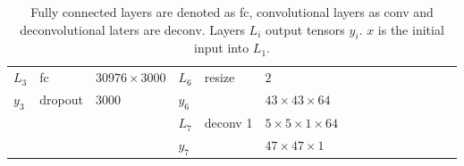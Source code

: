 \begin{landscape}
\begin{table}[h]
{\begin{tabular}{lllllllllllllll}
				\multicolumn{1}{|l|}{$L_3$}   & fc       & \multicolumn{1}{l|}{$30976\times3000$}           & \multicolumn{1}{l|}{$L_6$}   & resize   & \multicolumn{1}{l|}{$2$}                         &                              &                & \multicolumn{1}{l}{}                       &   &   &   &   &                             &   \\
				\multicolumn{1}{|l|}{$y_3$}   & dropout  & \multicolumn{1}{l|}{$3000$}                      & \multicolumn{1}{l|}{$y_6$}   &          & \multicolumn{1}{l|}{$43\times43\times64$}        &                              &                & \multicolumn{1}{l}{}                       &   &   &   &   &                             &   \\ \cline{1-6}
				                              &          &                                                  & \multicolumn{1}{|l|}{$L_7$}  & deconv 1 & \multicolumn{1}{l|}{$5\times 5\times1\times 64$} &                              &                & \multicolumn{1}{l}{}                       &   &   &   &   &                             &   \\
				                              &          &                                                  & \multicolumn{1}{|l|}{$y_7$}  &          & \multicolumn{1}{l|}{$47\times47\times1$}         &                              &                & \multicolumn{1}{l}{}                       &   &   &   &   &                             &   \\ \cline{4-6}
			\end{tabular}}
		\caption{Fully connected layers are denoted as fc, convolutional layers as conv and deconvolutional laters are deconv. Layers $L_i$ output tensors $y_i$. $x$ is the initial input into $L_1$.}
    \label{tab:netII}
	\end{table}



\end{landscape}

